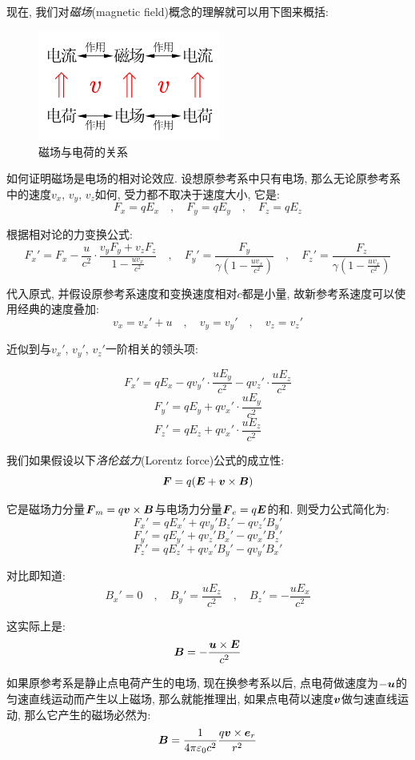 现在, 我们对\emph{磁场}(magnetic field)概念的理解就可以用下图来概括:

\begin{figure}
\centering
\includegraphics[width=6cm]{image/7-4-3.png}
\caption{磁场与电荷的关系}

\end{figure}

如何证明磁场是电场的相对论效应. 设想原参考系中只有电场, 那么无论原参考系中的速度$v_x,\,v_y,\,v_z$如何, 受力都不取决于速度大小, 它是:
\[F_x=qE_x\quad ,\quad F_y=qE_y \quad ,\quad  F_z=qE_z\]

根据相对论的力变换公式:
\[F_x'=F_x-\frac{u}{c^2}\cdot\frac{v_yF_y+v_zF_z}{1-\frac{uv_x}{c^2}}\quad ,\quad F_y'=\frac{F_y}{\gamma (1-\frac{uv_x}{c^2})}\quad ,\quad F_z'=\frac{F_z}{\gamma (1-\frac{uv_x}{c^2})}\]

代入原式, 并假设原参考系速度和变换速度相对$c$都是小量, 故新参考系速度可以使用经典的速度叠加:
\[v_x=v_x'+u\quad ,\quad v_y=v_y' \quad ,\quad v_z=v_z'\]

近似到与$v_x',\,v_y',\,v_z'$一阶相关的领头项:

\[F_x'=qE_x-qv_y'\cdot \frac{uE_y}{c^2}-qv_z'\cdot \frac{uE_z}{c^2}\]
\[F_y'=qE_y+qv_x'\cdot \frac{uE_y}{c^2}\]
\[F_z'=qE_z+qv_x'\cdot \frac{uE_z}{c^2}\]

我们如果假设以下\emph{洛伦兹力}(Lorentz force)公式的成立性:
\[\boldsymbol{F}=q(\boldsymbol{E}+\boldsymbol{v}\times \boldsymbol{B})\]

它是磁场力分量$\boldsymbol{F}_m=q\boldsymbol{v}\times \boldsymbol{B}$与电场力分量$\boldsymbol{F}_e=q\boldsymbol{E}$的和. 则受力公式简化为:
\[F_x'=qE_x'+qv_y'B_z'-qv_z'B_y'\]
\[F_y'=qE_y'+qv_z'B_x'-qv_x'B_z'\]
\[F_z'=qE_z'+qv_x'B_y'-qv_y'B_x'\]

对比即知道:
\[B_x'=0\quad ,\quad B_y'=\frac{uE_z}{c^2} \quad ,\quad B_z'=-\frac{uE_x}{c^2}\]

这实际上是:
\[\boldsymbol{B}=-\frac{\boldsymbol{u}\times \boldsymbol{E}}{c^2}\]

如果原参考系是静止点电荷产生的电场, 现在换参考系以后, 点电荷做速度为$-\boldsymbol{u}$的匀速直线运动而产生以上磁场, 那么就能推理出, 如果点电荷以速度$\boldsymbol{v}$做匀速直线运动, 那么它产生的磁场必然为:
\[\boldsymbol{B}=\frac{1}{4\pi \varepsilon_0 c^2}\frac{q\boldsymbol{v}\times \boldsymbol{e}_r}{r^2}\]


